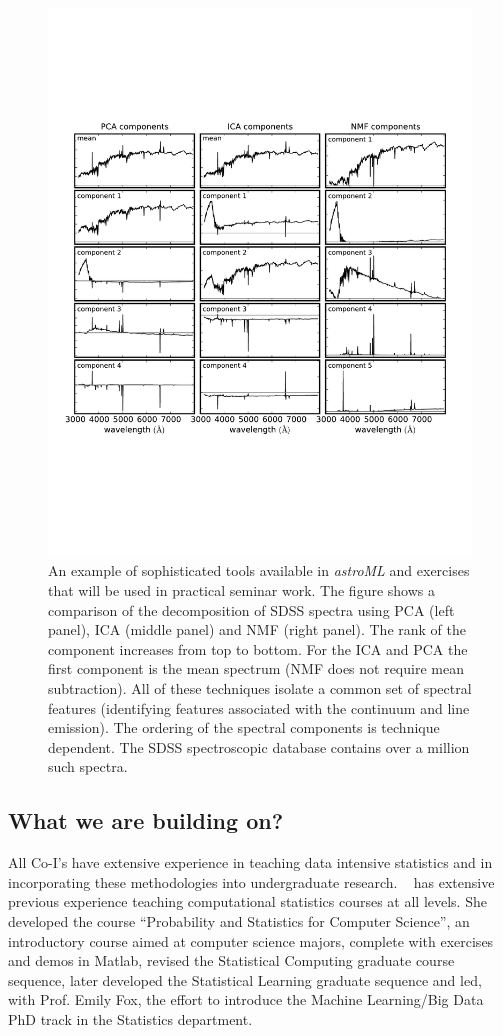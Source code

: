 \begin{figure}[!t]
\vskip -1.9in
\phantom{x} \hskip 0.7in 
\includegraphics[width=0.8\hsize,clip]{astroML2.pdf}
\vskip -1.6in
\caption{An example of sophisticated tools available in {\it astroML} and exercises that will be
used in practical seminar work. The figure shows a comparison of the decomposition of SDSS 
spectra using PCA (left panel), ICA (middle panel) and NMF (right panel). The rank of the component
increases from top to bottom. For the ICA and PCA the first component is the mean spectrum (NMF 
does not require mean subtraction). All of these techniques isolate a common set of spectral features 
(identifying features associated with the continuum and line emission). The ordering of the spectral 
components is technique dependent. The SDSS spectroscopic database contains over a million
such spectra.} 
\label{Fig:astroML2}
\end{figure}


\subsection{What we are building on?}
\label{sec:precursors}

All Co-I's have extensive experience in teaching data intensive
statistics and in incorporating these methodologies into undergraduate
research. \meila~ has extensive previous experience teaching
computational statistics courses at all levels. She developed the
course ``Probability and Statistics for Computer Science'', an
introductory course aimed at computer science majors, complete with
exercises and demos in Matlab, revised the Statistical Computing
graduate course sequence, later developed the Statistical Learning
graduate sequence and led, with Prof. Emily Fox, the effort to
introduce the Machine Learning/Big Data PhD track in the Statistics
department.

